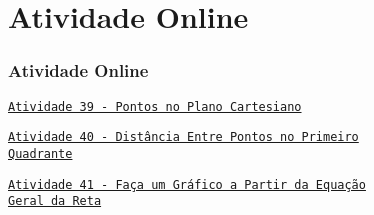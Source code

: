 \section{Atividade Online}
\begin{frame}
\frametitle{Atividade Online} 

\href{https://pt.khanacademy.org/math/basic-geo/basic-geo-coord-plane/x7fa91416:points-in-all-four-quadrants/e/identifying_points_1}
{{\tt Atividade 39 - Pontos no Plano Cartesiano}}

\href{https://pt.khanacademy.org/math/basic-geo/basic-geo-coord-plane/x7fa91416:coordinate-plane-word-problems/e/distance-between-points-in-first-quadrant-of-coordinate-plane}
{{\tt Atividade 40 - Distância Entre Pontos no Primeiro \\Quadrante}}

\href{https://pt.khanacademy.org/math/algebra/x2f8bb11595b61c86:forms-of-linear-equations/x2f8bb11595b61c86:standard-form/e/graph-from-standard-form-equation}
{{\tt Atividade 41 - Faça um Gráfico a Partir da Equação \\Geral da Reta}}


\end{frame}